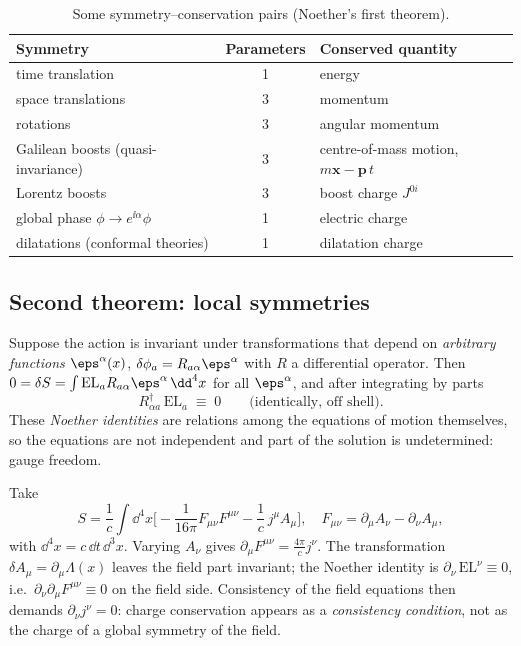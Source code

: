 \begin{table}[ht]
\centering
\small
\renewcommand{\arraystretch}{1.2}
\begin{tabular}{@{}lcl@{}}
\toprule
Symmetry & Parameters & Conserved quantity\\
\midrule
time translation & 1 & energy\\
space translations & 3 & momentum\\
rotations & 3 & angular momentum\\
Galilean boosts (quasi-invariance) & 3 & centre-of-mass motion, $m{\bm{x}}-{\bm{p}}\,t$\\
Lorentz boosts & 3 & boost charge $J^{0i}$\\
global phase $\phi\to e^{\ii\alpha}\phi$ & 1 & electric charge\\
dilatations (conformal theories) & 1 & dilatation charge\\
\bottomrule
\end{tabular}
\caption{Some symmetry--conservation pairs (Noether's first theorem).}
\label{tab:noether}
\end{table}

\subsection{Second theorem: local symmetries}

Suppose the action is invariant under transformations that depend on
\emph{arbitrary functions} $\eps^\alpha(x)$,
$\delta\phi_a=R_{a\alpha}\eps^\alpha$ with $R$ a differential operator. Then
$0=\delta S=\int \mathrm{EL}_a R_{a\alpha}\eps^\alpha\,\dd^4x$ for all
$\eps^\alpha$, and after integrating by parts
\begin{equation}\label{noether2}
  R^{\dagger}_{\alpha a}\,\mathrm{EL}_a\;\equiv\;0\qquad\text{(identically, off shell).}
\end{equation}
These \emph{Noether identities} are relations among the equations of motion
themselves, so the equations are not independent and part of the solution is
undetermined: gauge freedom.

\begin{example}[Electrodynamics]\label{ex:noether2-em}
Take
\begin{equation}\label{maxwell-action}
  S=\frac1c\int \dd^4x\Big[-\frac{1}{16\pi}F_{\mu\nu}F^{\mu\nu}-\frac1c\,j^\mu A_\mu\Big],
  \quad F_{\mu\nu}=\partial_\mu A_\nu-\partial_\nu A_\mu,
\end{equation}
with $\dd^4x=c\,\dd t\,\dd^3x$. Varying $A_\nu$ gives
$\partial_\mu F^{\mu\nu}=\tfrac{4\pi}{c}j^\nu$. The transformation
$\delta A_\mu=\partial_\mu\Lambda(x)$ leaves the field part invariant; the
Noether identity is $\partial_\nu\,\mathrm{EL}^\nu\equiv0$, i.e.\
$\partial_\nu\partial_\mu F^{\mu\nu}\equiv0$ on the field side. Consistency of
the field equations then demands $\partial_\nu j^\nu=0$: charge conservation
appears as a \emph{consistency condition}, not as the charge of a
global symmetry of the field.
\end{example}

